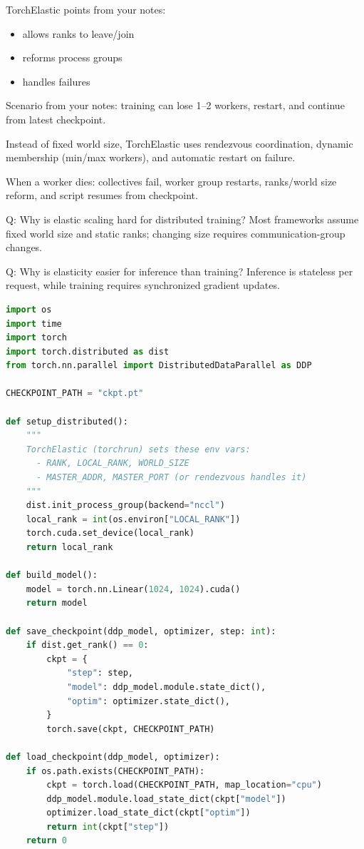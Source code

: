 \documentclass[12pt]{article}
\begin{document}
\begin{itemize}
TorchElastic points from your notes:
\begin{itemize}
\item allows ranks to leave/join
\item reforms process groups
\item handles failures
\end{itemize}

Scenario from your notes: training can lose 1--2 workers, restart, and continue from latest checkpoint.

Instead of fixed world size, TorchElastic uses rendezvous coordination, dynamic membership (min/max workers), and automatic restart on failure.

When a worker dies: collectives fail, worker group restarts, ranks/world size reform, and script resumes from checkpoint.

Q: Why is elastic scaling hard for distributed training?  
Most frameworks assume fixed world size and static ranks; changing size requires communication-group changes.

Q: Why is elasticity easier for inference than training?  
Inference is stateless per request, while training requires synchronized gradient updates.

\begin{lstlisting}[language=Python, caption={TorchElastic resume sketch from notes}]
import os
import time
import torch
import torch.distributed as dist
from torch.nn.parallel import DistributedDataParallel as DDP

CHECKPOINT_PATH = "ckpt.pt"

def setup_distributed():
    """
    TorchElastic (torchrun) sets these env vars:
      - RANK, LOCAL_RANK, WORLD_SIZE
      - MASTER_ADDR, MASTER_PORT (or rendezvous handles it)
    """
    dist.init_process_group(backend="nccl")
    local_rank = int(os.environ["LOCAL_RANK"])
    torch.cuda.set_device(local_rank)
    return local_rank

def build_model():
    model = torch.nn.Linear(1024, 1024).cuda()
    return model

def save_checkpoint(ddp_model, optimizer, step: int):
    if dist.get_rank() == 0:
        ckpt = {
            "step": step,
            "model": ddp_model.module.state_dict(),
            "optim": optimizer.state_dict(),
        }
        torch.save(ckpt, CHECKPOINT_PATH)

def load_checkpoint(ddp_model, optimizer):
    if os.path.exists(CHECKPOINT_PATH):
        ckpt = torch.load(CHECKPOINT_PATH, map_location="cpu")
        ddp_model.module.load_state_dict(ckpt["model"])
        optimizer.load_state_dict(ckpt["optim"])
        return int(ckpt["step"])
    return 0


\end{lstlisting}
\end{itemize}
\end{document}
